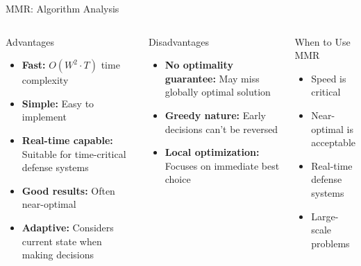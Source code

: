 \documentclass[aspectratio=43,8pt]{beamer}
\begin{document}
\begin{frame}{MMR: Algorithm Analysis}
\begin{columns}[t]
\begin{block}{Advantages}
\begin{itemize}
    \item \textbf{Fast:} $O(W^2 \cdot T)$ time complexity
    \item \textbf{Simple:} Easy to implement
    \item \textbf{Real-time capable:} Suitable for time-critical defense systems
    \item \textbf{Good results:} Often near-optimal
    \item \textbf{Adaptive:} Considers current state when making decisions
\end{itemize}
\end{block}

\begin{alertblock}{Disadvantages}
\begin{itemize}
    \item \textbf{No optimality guarantee:} May miss globally optimal solution
    \item \textbf{Greedy nature:} Early decisions can't be reversed
    \item \textbf{Local optimization:} Focuses on immediate best choice
\end{itemize}
\end{alertblock}

\begin{exampleblock}{When to Use MMR}
\begin{itemize}
    \item Speed is critical
    \item Near-optimal is acceptable
    \item Real-time defense systems
    \item Large-scale problems
\end{itemize}
\end{exampleblock}
\end{columns}
\end{frame}
\end{document}
